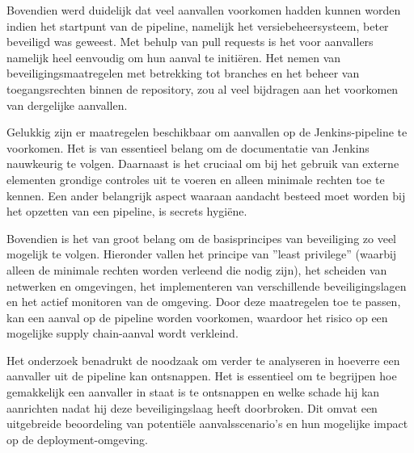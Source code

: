 Bovendien werd duidelijk dat veel aanvallen voorkomen hadden kunnen worden indien het startpunt van de pipeline, namelijk het versiebeheersysteem, beter beveiligd was geweest. Met behulp van pull requests is het voor aanvallers namelijk heel eenvoudig om hun aanval te initiëren. Het nemen van beveiligingsmaatregelen met betrekking tot branches en het beheer van toegangsrechten binnen de repository, zou al veel bijdragen aan het voorkomen van dergelijke aanvallen.
\newline

Gelukkig zijn er maatregelen beschikbaar om aanvallen op de Jenkins-pipeline te voorkomen. Het is van essentieel belang om de documentatie van Jenkins nauwkeurig te volgen. Daarnaast is het cruciaal om bij het gebruik van externe elementen grondige controles uit te voeren en alleen minimale rechten toe te kennen. Een ander belangrijk aspect waaraan aandacht besteed moet worden bij het opzetten van een pipeline, is secrets hygiëne.
\newline

Bovendien is het van groot belang om de basisprincipes van beveiliging zo veel mogelijk te volgen. Hieronder vallen het principe van ''least privilege'' (waarbij alleen de minimale rechten worden verleend die nodig zijn), het scheiden van netwerken en omgevingen, het implementeren van verschillende beveiligingslagen en het actief monitoren van de omgeving. Door deze maatregelen toe te passen, kan een aanval op de pipeline worden voorkomen, waardoor het risico op een mogelijke supply chain-aanval wordt verkleind.
\newline

Het onderzoek benadrukt de noodzaak om verder te analyseren in hoeverre een aanvaller uit de pipeline kan ontsnappen. Het is essentieel om te begrijpen hoe gemakkelijk een aanvaller in staat is te ontsnappen en welke schade hij kan aanrichten nadat hij deze beveiligingslaag heeft doorbroken. Dit omvat een uitgebreide beoordeling van potentiële aanvalsscenario's en hun mogelijke impact op de deployment-omgeving.





